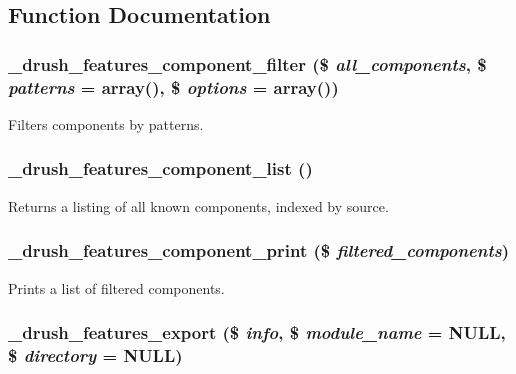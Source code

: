 \subsection{Function Documentation}
\hypertarget{features_8drush_8inc_a01f48749fead1e5c6982f6c554d49454}{
\subsubsection[{\_\-drush\_\-features\_\-component\_\-filter}]{\setlength{\rightskip}{0pt plus 5cm}\_\-drush\_\-features\_\-component\_\-filter (\$ {\em all\_\-components}, \/  \$ {\em patterns} = {\ttfamily array()}, \/  \$ {\em options} = {\ttfamily array()})}}
\label{features_8drush_8inc_a01f48749fead1e5c6982f6c554d49454}
Filters components by patterns. \hypertarget{features_8drush_8inc_a8c810b2c994b99f9307a4cedbbbd7f0c}{
\subsubsection[{\_\-drush\_\-features\_\-component\_\-list}]{\setlength{\rightskip}{0pt plus 5cm}\_\-drush\_\-features\_\-component\_\-list ()}}
\label{features_8drush_8inc_a8c810b2c994b99f9307a4cedbbbd7f0c}
Returns a listing of all known components, indexed by source. \hypertarget{features_8drush_8inc_a4721c725c6eeaf6030a1e073835fe8ad}{
\subsubsection[{\_\-drush\_\-features\_\-component\_\-print}]{\setlength{\rightskip}{0pt plus 5cm}\_\-drush\_\-features\_\-component\_\-print (\$ {\em filtered\_\-components})}}
\label{features_8drush_8inc_a4721c725c6eeaf6030a1e073835fe8ad}
Prints a list of filtered components. \hypertarget{features_8drush_8inc_a3773d63fc524e8440924d9f79cc1231a}{
\subsubsection[{\_\-drush\_\-features\_\-export}]{\setlength{\rightskip}{0pt plus 5cm}\_\-drush\_\-features\_\-export (\$ {\em info}, \/  \$ {\em module\_\-name} = {\ttfamily NULL}, \/  \$ {\em directory} = {\ttfamily NULL})}}
